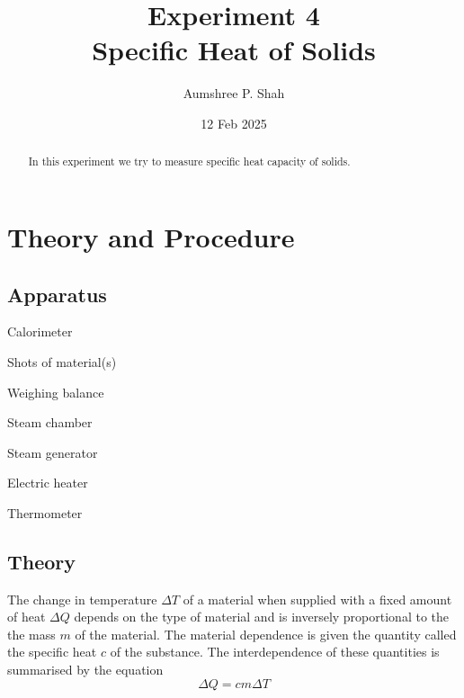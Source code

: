 \documentclass[%
 sor,
 jor,
 amsmath,amssymb,
 reprint,%
]{revtex4-2}
\begin{document}

\title{Experiment 4\\Specific Heat of Solids}

\author{Aumshree P. Shah}



\date{12 Feb 2025}
\vspace{1cm}
\begin{abstract}
\centering
In this experiment we try to measure specific heat capacity of solids.
\end{abstract}
\maketitle
\section{Theory and Procedure}
\subsection{Apparatus}

{\small
\begin{itemize}
\begin{minipage}[t]{0.45\textwidth}
    \item Calorimeter
    \item Shots of material(s)
    \item Weighing balance
    \item Steam chamber
\end{minipage}
\hfill
\begin{minipage}[t]{0.45\textwidth}
    \item Steam generator
    \item Electric heater
    \item Thermometer
\end{minipage}
\end{itemize}
}

\subsection{Theory}

The change in temperature $\Delta T$ of a material when supplied with a fixed amount of heat $\Delta Q$ depends
on the type of material and is inversely proportional to the the mass $m$ of the material. The material dependence
is given the quantity called the specific heat $c$ of the substance. The interdependence of these quantities is
summarised by the equation$$\Delta Q= cm \Delta T$$
\end{document}
